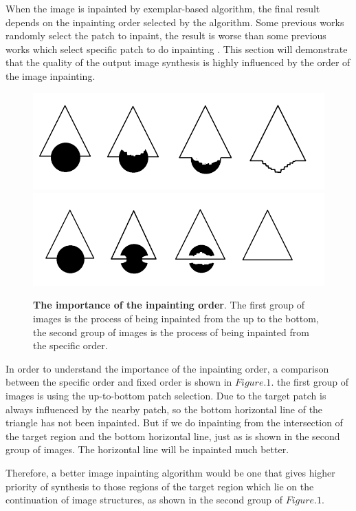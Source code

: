 When the image is inpainted by exemplar-based algorithm, the final result depends on the inpainting order selected by the algorithm. Some previous works randomly select the patch to inpaint, the result is worse than some previous works which select specific patch to do inpainting \etal \cite{sivip16}. This section will demonstrate that the quality of
the output image synthesis is highly influenced by the order of the image inpainting. 
\begin{figure}
	\centering
	\includegraphics[width=0.94\linewidth]{order1.jpg}
	\includegraphics[width=1.0\linewidth]{order2.jpg}
	\caption{\textbf{The importance of the inpainting order}. The first group of images is the process of being inpainted from the up to the bottom, the second group of images is the process of being inpainted from the specific order.}
\end{figure}

In order to understand the importance of the inpainting order, a comparison between the specific order and fixed order is shown in $Figure.1$. the first group of images is using the up-to-bottom patch selection. Due to the target patch is always influenced by the nearby patch, so the bottom horizontal line of the triangle has not been inpainted. But if we do inpainting from the intersection of the target region and the bottom horizontal line, just as is shown in the second group of images. The horizontal line will be inpainted much better.

Therefore, a better image inpainting algorithm would be one that gives higher priority of synthesis to those regions of the target region which lie on
the continuation of image structures, as shown in the second group of $Figure.1$. 

